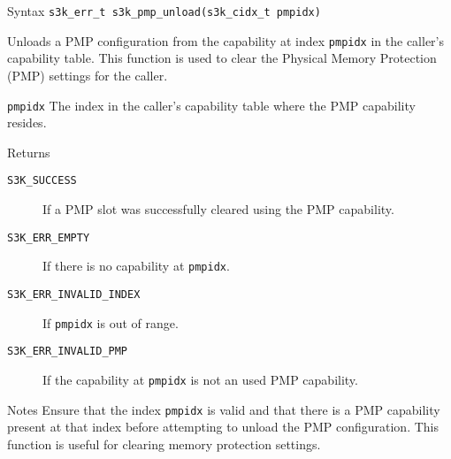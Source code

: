 \documentclass[a4paper,11pt]{article}
\newenvironment{syscalldoc}[1]{
  \begin{tcolorbox}[breakable,title=\subsection{\texttt{#1()}}]
  \begin{description}[leftmargin=!,style=nextline,noitemsep]
}{
  \end{description}
  \end{tcolorbox}
}
\begin{document}
\begin{syscalldoc}{s3k\_pmp\_unload}
  \item[Syntax] \lstinline{s3k_err_t s3k_pmp_unload(s3k_cidx_t pmpidx)}

  \item[Description] 
	  Unloads a PMP configuration from the capability at index \verb|pmpidx| in the caller's capability table. This function is used to clear the Physical Memory Protection (PMP) settings for the caller.

  \item[Parameters]
    \begin{description}
      \item[]
      \item[\texttt{pmpidx}] The index in the caller's capability table where the PMP capability resides.
    \end{description}

  \item[Returns]
    \begin{description}
      \item[]
      \item[\texttt{S3K\_SUCCESS}] If a PMP slot was successfully cleared using the PMP capability.
      \item[\texttt{S3K\_ERR\_EMPTY}] If there is no capability at \verb|pmpidx|.
      \item[\texttt{S3K\_ERR\_INVALID\_INDEX}] If \verb|pmpidx| is out of range.
      \item[\texttt{S3K\_ERR\_INVALID\_PMP}] If the capability at \verb|pmpidx| is not an used PMP capability.
    \end{description}

    \item[Notes] 
	    Ensure that the index \verb|pmpidx| is valid and that there is a PMP capability present at that index before attempting to unload the PMP configuration. This function is useful for clearing memory protection settings.
\end{syscalldoc}
\end{document}
